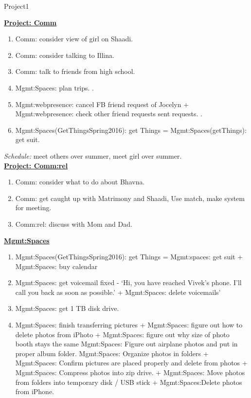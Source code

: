 \begin{columns}
\begin{column}{0.333\columnwidth}
\begin{block}{Project1}
\begin{enumerate}
{\underline{\bf Project: Comm}}
\begin{enumerate}
\item \tiny Comm: consider view of girl on Shaadi. 
\item \tiny Comm: consider talking to Illina.
\item \tiny Comm: talk to friends from high school.
\item \tiny Mgmt:Spaces: plan trips. \te{-}.
\item \tiny Mgmt:webpresence: cancel FB friend request of
  Jocelyn + Mgmt:webpresence: check other friend requests
  sent requests. \te{-}. 
\item \tiny Mgmt:Spaces(GetThingsSpring2016): get Things =
  Mgmt:Spaces(getThings): get suit.
\end{enumerate}
{\it Schedule:} meet others over summer, meet girl over summer.\\

{\underline{\bf Project: Comm:rel}}
\begin{enumerate} 
  \tiny \item \tiny Comm: consider what to do about Bhavna.
\item \tiny Comm: get caught up with Matrimony and Shaadi, Use match,
  make system for meeting. 
\item \tiny Comm:rel: discuss with Mom and Dad. 
\end{enumerate} 

{\underline{\bf Mgmt:Spaces}}\\
\begin{enumerate} 
\item \tiny Mgmt:Spaces(GetThingsSpring2016): get Things = Mgmt:spaces: get suit
+ Mgmt:Spaces: buy calendar 
\item \tiny Mgmt:Spaces: get voicemail fixed  - ‘Hi, you have reached Vivek’s
phone. I’ll call you back as soon as possible.’ + Mgmt:Spaces: delete
voicemails’ 
\item \tiny Mgmt:Spaces: get 1 TB disk drive. 
\item \tiny Mgmt:Spaces: finish transferring pictures + Mgmt:Spaces: figure out
how to delete photos from iPhoto + Mgmt:Spaces: figure out why size of
photo booth stays the same  Mgmt:Spaces: Figure out airplane photos
and put in proper album folder. Mgmt:Spaces: Organize photos in
folders + Mgmt:Spaces: Confirm pictures are placed properly and delete
from photos + Mgmt:Spaces: Compress photos into zip drive. +
Mgmt:Spaces: Move photos from folders into temporary disk / USB stick 
+ Mgmt:Spaces:Delete photos from iPhone.
\end{enumerate} 


\end{enumerate}
\end{block}
\end{column}
\end{columns}
